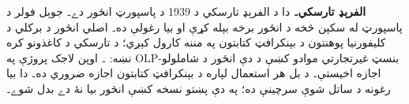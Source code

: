 \textbf{الفرېډ تارسکي۔} دا د الفرېډ تارسکي د 1939 د پاسپورټ انځور دے۔ جوېل فولر د پاسپورټ له سکېن څخه د انځور برخه بېله کړې او بيا رغولې ده۔ اصلي انځور د برکلي د کليفورنيا پوهنتون د بېنکرافټ کتابتون په مننه کارول کېږي؛ د تارسکي د کاغذونو کره نښه: ۔ اوپن لاجک پروژې په OLP-بنسټ غيرتجارتي موادو کښې د دې انځور د شاملولو اجازه اخيستې۔ د بل هر استعمال لپاره د بېنکرافټ کتابتون اجازه ضروري ده۔ دا بيا رغونه د ساتل شوې سرچينې ده؛ په دې پښتو نسخه کښې انځور بيا نۀ دے بدل شوے۔
